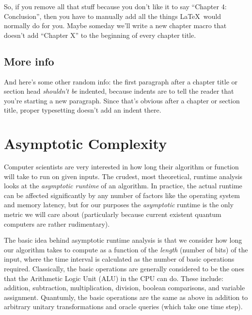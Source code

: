 \documentclass[12pt,twoside]{reedthesis}
\theoremstyle{definition}
\begin{document}
So, if you remove all that stuff because you don't like it to say ``Chapter 4: Conclusion'', then you have to manually add all the things \LaTeX\ would normally do for you. Maybe someday we'll write a new chapter macro that doesn't add ``Chapter X'' to the beginning of every chapter title.

\section{More info}
And here's some other random info: the first paragraph after a chapter title or section head \emph{shouldn't be} indented, because indents are to tell the reader that you're starting a new paragraph. Since that's obvious after a chapter or section title, proper typesetting doesn't add an indent there. 


    \appendix
    	\chapter{Asymptotic Complexity}
    	Computer scientists are very interested in how long their algorithm or function will take to run on given inputs. The crudest, most theoretical, runtime analysis looks at the \textit{asymptotic runtime} of an algorithm. In practice, the actual runtime can be affected significantly by any number of factors like the operating system and memory  latency, but for our purposes the 
\textit{asymptotic} runtime is the only metric we will care about (particularly because current existent quantum computers are rather rudimentary).

The basic idea behind asymptotic runtime analysis is that we consider how long our algorithm takes to compute as a function of the \textit{length} (number of bits) of the input, where the time interval is calculated as the number of basic operations required. Classically, the basic operations are generally considered to be the ones that the Arithmetic Logic Unit (ALU) in the CPU can do. These include: addition, subtraction, multiplication, division, boolean comparisons, and variable assignment. Quantumly, the basic operations are the same as above in addition to arbitrary unitary transformations and oracle queries (which take one time step). 
\end{document}
